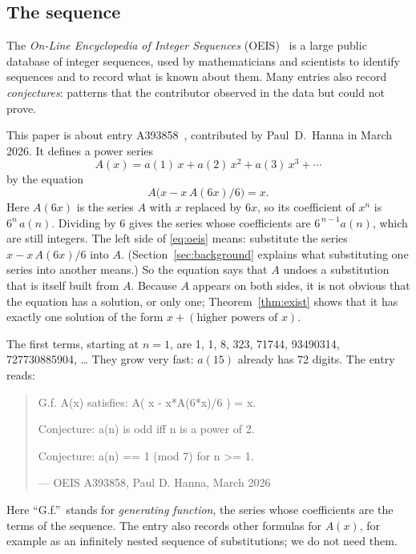 \documentclass[11pt,a4paper]{article}
\theoremstyle{definition}
\theoremstyle{remark}
\begin{document}
\subsection{The sequence}\label{sec:sequence}
The \emph{On-Line Encyclopedia of Integer Sequences} (OEIS)~\cite{oeisdb} is a large public database of integer
sequences, used by mathematicians and scientists to identify sequences and to record what is known about them. Many
entries also record \emph{conjectures}: patterns that the contributor observed in the data but could not prove.

This paper is about entry A393858~\cite{oeis}, contributed by Paul~D.~Hanna in March 2026. It defines a power series
\[
A(x)=a(1)\,x+a(2)\,x^2+a(3)\,x^3+\cdots
\]
by the equation
\begin{equation}\label{eq:oeis}
A\bigl(x-x\,A(6x)/6\bigr)=x.
\end{equation}
Here $A(6x)$ is the series $A$ with $x$ replaced by $6x$, so its coefficient of $x^n$ is
$6^n\,a(n)$. Dividing by $6$ gives the series whose coefficients are
$6^{\,n-1}a(n)$, which are still integers. The left side of \eqref{eq:oeis} means: substitute the series
$x-x\,A(6x)/6$ into $A$. (Section~\ref{sec:background} explains what substituting one
series into another means.) So the equation says that $A$ undoes a substitution that is itself built from $A$. Because
$A$ appears on both sides, it is not obvious that the equation has a solution, or only one; Theorem~\ref{thm:exist}
shows that it has exactly one solution of the form $x+(\text{higher powers of }x)$.

The first terms, starting at $n=1$, are 1, 1, 8, 323, 71744, 93490314, 727730885904, \dots{} They grow very fast: $a(15)$
already has 72 digits. The entry reads:
\begin{quote}\small\ttfamily\raggedright G.f. A(x) satisfies: A( x - x*A(6*x)/6 ) = x.\par\smallskip Conjecture: a(n) is odd iff n is a power of 2.\par\smallskip Conjecture: a(n) == 1 (mod 7) for n >= 1.\par\smallskip\hfill\textrm{--- OEIS A393858, Paul D. Hanna, March 2026}\end{quote}

Here ``G.f.''\ stands for \emph{generating function}, the series whose coefficients are the terms of the sequence.
The entry also records other formulas for $A(x)$, for example as an infinitely nested sequence of substitutions; we do
not need them.
\end{document}
